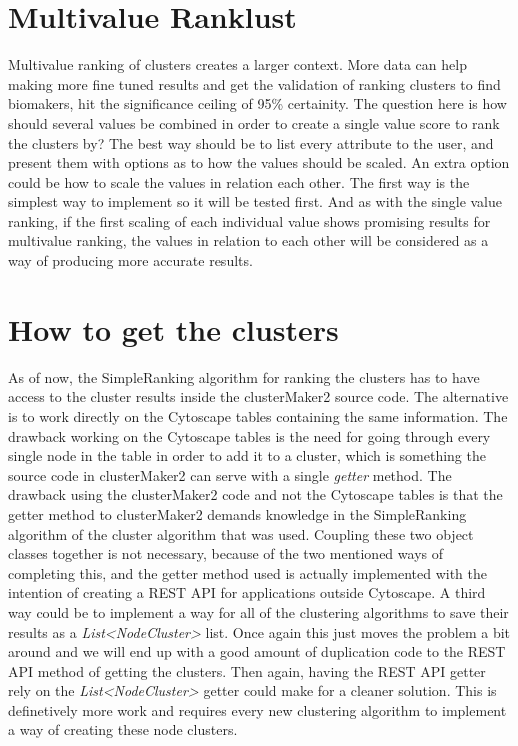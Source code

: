 \section{Multivalue Ranklust}
Multivalue ranking of clusters creates a larger context. More data can help
making more fine tuned results and get the validation of ranking clusters to
find biomakers, hit the significance ceiling of 95\% certainity. 
The question here is how should several values be combined in order to create a
single value score to rank the clusters by? The best way should be to list every
attribute to the user, and present them with options as to how the values should
be scaled. An extra option could be how to scale the values in relation each
other. The first way is the simplest way to implement so it will be tested
first. And as with the single value ranking, if the first scaling of each
individual value shows promising results for multivalue ranking, the values in
relation to each other will be considered as a way of producing more accurate
results.

\section{How to get the clusters}
As of now, the SimpleRanking algorithm for ranking the clusters has to have
access to the cluster results inside the clusterMaker2 source code. The
alternative is to work directly on the Cytoscape tables containing the same
information. The drawback working on the Cytoscape tables is the need for going
through every single node in the table in order to add it to a cluster, which is
something the source code in clusterMaker2 can serve with a single
\textit{getter} method. The drawback using the clusterMaker2 code and not the
Cytoscape tables is that the getter method to clusterMaker2 demands knowledge in
the SimpleRanking algorithm of the cluster algorithm that was used. Coupling
these two object classes together is not necessary, because of the two mentioned
ways of completing this, and the getter method used is actually implemented with
the intention of creating a REST API \cite{rest-api} for applications outside
Cytoscape. A third way could be to implement a way for all of the clustering
algorithms to save their results as a \textit{List<NodeCluster>} list. Once
again this just moves the problem a bit around and we will end up with a good
amount of duplication code to the REST API method of getting the clusters. Then
again, having the REST API getter rely on the \textit{List<NodeCluster>} getter
could make for a cleaner solution. This is definetively more work and requires
every new clustering algorithm to implement a way of creating these node
clusters.

